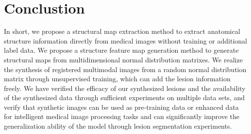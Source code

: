 \documentclass[runningheads]{llncs}
\begin{document}
	\section{Conclustion}
	In short, we propose a structural map extraction method to extract anatomical structure information directly from medical images without training or additional label data.
	We propose a structure feature map generation method to generate structural maps from multidimensional normal distribution matrixes.
	We realize the synthesis of registered multimodal images from a random normal distribution matrix through unsupervised training, which can add the lesion information freely.
	We have verified the efficacy of our synthesized lesions and the availability of the synthesized data through sufficient experiments on multiple data sets, and verify that synthetic images can be used as pre-training data or enhanced data for intelligent medical image processing tasks and can significantly improve the generalization ability of the model through lesion segmentation experiments.
	
	
	
	
	
\end{document}
